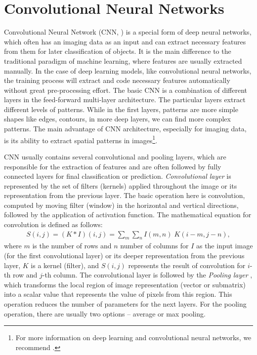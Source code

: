 \documentclass[fleqn,usenatbib]{mnras}
\begin{document}
 
\section{Convolutional Neural Networks}
Convolutional Neural Network (CNN, \citet{cnn}) is a special form of deep neural networks, which often has an imaging data as an input and can extract necessary features from them for later classification of objects. It is the main difference to the traditional paradigm of machine learning, where features are usually extracted manually. In the case of deep learning models, like convolutional neural networks, the training process will extract and code necessary features automatically without great pre-processing effort. The basic CNN is a combination of different layers in the feed-forward multi-layer architecture. The particular layers extract different levels of patterns. While in the first layers, patterns are more simple shapes like edges, contours, in more deep layers, we can find more complex patterns. The main advantage of CNN architecture, especially for imaging data, is its ability to extract spatial patterns in images\footnote{For more information on deep learning and convolutional neural networks, we recommend \cite{Goodfellow-et-al-2016}.}. 

CNN usually contains several convolutional and pooling layers, which are responsible for the extraction of features and are often followed by fully connected layers for final classification or prediction. \textit{Convolutional layer} is represented by the set of filters (kernels) applied throughout the image or its representation from the previous layer. The basic operation here is convolution, computed by moving filter (window) in the horizontal and vertical directions, followed by the application of activation function. The mathematical equation for convolution is defined as follows:
     \begin{eqnarray}
     S(i,j)=(K*I)(i,j)=\sum_m \sum_n I(m,n)\;K(i-m,j-n),
    \end{eqnarray}
where $m$ is the number of rows and $n$ number of columns for $I$ as the input image (for the first convolutional layer) or its deeper representation from the previous layer, $K$ is a kernel (filter), and $S(i,j)$ represents the result of convolution for $i$-th row and $j$-th column. The convolutional layer is followed by the \textit{Pooling layer} \citep{maxp}, which transforms the local region of image representation (vector or submatrix) into a scalar value that represents the value of pixels from this region. This operation reduces the number of parameters for the next layers. For the pooling operation, there are usually two options – average or max pooling. 
\end{document}
